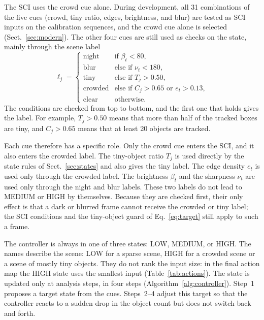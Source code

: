 \documentclass[pdflatex,sn-mathphys-num,iicol]{sn-jnl}
\makeatletter
\def\subsectionfont{\reset@font\fontfamily{\rmdefault}\fontsize{10bp}{12bp}\bfseries\selectfont\raggedright\boldmath}
\renewcommand\subsection{\@startsection{subsection}{2}{\z@}{-7pt \@plus -2pt \@minus -2pt}{3pt}{\subsectionfont}}
\makeatother
\begin{document}
The SCI uses the crowd cue alone. During development, all 31 combinations of
the five cues (crowd, tiny ratio, edges, brightness, and blur) are tested as
SCI inputs on the calibration sequences, and the crowd cue alone is selected
(Sect.~\ref{sec:modern}). The other four cues are still used as checks on the
state, mainly through the scene label
\begin{equation}
\ell_j=\begin{cases}
\text{night}   & \text{if } \beta_t<80,\\
\text{blur}    & \text{else if } \nu_t<180,\\
\text{tiny}    & \text{else if } T_j>0.50,\\
\text{crowded} & \text{else if } C_j>0.65 \text{ or } e_t>0.13,\\
\text{clear}   & \text{otherwise.}
\end{cases}
\label{eq:label}
\end{equation}
The conditions are checked from top to bottom, and the first one that holds
gives the label. For example, $T_j>0.50$ means that more than half of the
tracked boxes are tiny, and $C_j>0.65$ means that at least 20 objects are
tracked.

Each cue therefore has a specific role. Only the crowd cue enters the SCI,
and it also enters the crowded label. The tiny-object ratio $T_j$ is used directly by the state rules of
Sect.~\ref{sec:states} and also gives the tiny label. The edge density $e_t$
is used only through the crowded label. The brightness $\beta_t$ and the
sharpness $\nu_t$ are used only through the night and blur labels. These two
labels do not lead to MEDIUM or HIGH by themselves. Because they are checked
first, their only effect is that a dark or blurred frame cannot receive the
crowded or tiny label; the SCI conditions and the tiny-object guard of
Eq.~\eqref{eq:target} still apply to such a frame.

\subsection{Three-state controller}\label{sec:states}
The controller is always in one of three states: LOW, MEDIUM, or HIGH. The
names describe the scene: LOW for a sparse scene, HIGH for a crowded scene or
a scene of mostly tiny objects. They do not rank the input size: in the final
action map the HIGH state uses the smallest input (Table~\ref{tab:actions}).
The state is updated only at analysis steps, in four steps
(Algorithm~\ref{alg:controller}). Step~1 proposes a target state from the
cues. Steps~2--4 adjust this target so that the controller reacts to a sudden
drop in the object count but does not switch back and forth.
\end{document}

